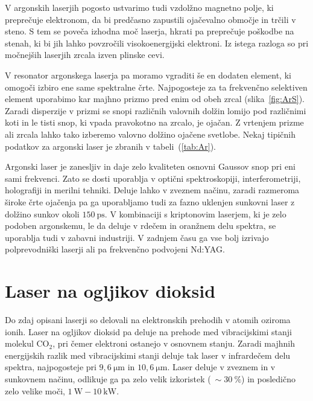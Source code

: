 V argonskih laserjih pogosto ustvarimo tudi vzdolžno magnetno polje, ki preprečuje 
elektronom, da bi predčasno zapustili ojačevalno območje in trčili v steno. S
tem se poveča izhodna moč laserja, hkrati pa preprečuje poškodbe na stenah, ki bi jih 
lahko povzročili visokoenergijski elektroni. Iz istega razloga so pri močnejših
laserjih zrcala izven plinske cevi. 

V resonator argonskega laserja pa moramo vgraditi še en dodaten element, ki omogoči
izbiro ene same spektralne črte. Najpogosteje za ta frekvenčno selektiven element
uporabimo kar majhno prizmo pred enim od obeh zrcal (slika~\ref{fig:ArS}). Zaradi disperzije
v prizmi se snopi različnih valovnih dolžin lomijo pod različnimi koti in le tisti 
snop, ki vpada pravokotno na zrcalo, je ojačan. Z vrtenjem prizme ali zrcala lahko 
tako izberemo valovno dolžino ojačene svetlobe. Nekaj tipičnih podatkov za argonski
laser je zbranih v tabeli~(\ref{tab:Ar}).

Argonski laser je zanesljiv in daje zelo kvaliteten osnovni Gaussov snop pri eni
sami frekvenci. Zato se dosti uporablja v optični spektroskopiji,
interferometriji, holografiji in merilni tehniki. Deluje lahko v zveznem načinu,
zaradi razmeroma široke črte ojačenja pa ga uporabljamo tudi za fazno uklenjen
sunkovni laser z dolžino sunkov okoli $150~\si{\pico\second}$. 
V kombinaciji s kriptonovim laserjem, ki je zelo podoben argonskemu, le da deluje
v rdečem in oranžnem delu spektra, se uporablja tudi v zabavni industriji.
V zadnjem času ga vse bolj izrivajo polprevodniški laserji ali pa frekvenčno
podvojeni Nd:YAG. 

\section{Laser na ogljikov dioksid}
Do zdaj opisani laserji so delovali na elektronskih prehodih v atomih oziroma ionih. 
Laser na ogljikov dioksid pa deluje na prehode med vibracijskimi stanji molekul 
CO$_2$, pri čemer elektroni ostanejo v osnovnem stanju.
Zaradi majhnih energijskih razlik med vibracijskimi stanji deluje
tak laser v infrardečem delu spektra, najpogosteje pri 
$9,6~\si{\micro\metre}$ in $10,6~\si{\micro\metre}$. Laser deluje v zveznem
in v sunkovnem načinu, odlikuje ga pa zelo velik izkoristek ($~\sim 30~\%$) in 
posledično zelo velike moči, $1~\si{\watt} - 10~\si{\kilo\watt}$. 

